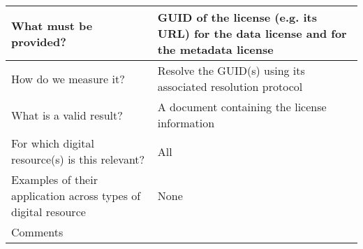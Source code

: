 \documentclass[english]{article}
\begin{document}
\begin{longtable}{|p{5cm}|p{9cm}|}
\hline
What must be provided? &  


GUID of the license (e.g. its URL) for the data license and for the metadata license

\\



\hline
How do we measure it? &  

Resolve the GUID(s) using its associated resolution protocol



\\



\hline
What is a valid result? &  


A document containing the license information

\\



\hline
For which digital resource(s) is this relevant? &  All\\



\hline
Examples of their application across types of digital resource &  None

\\



\hline

Comments & 


\\
\hline

\end{longtable}
\end{document}
